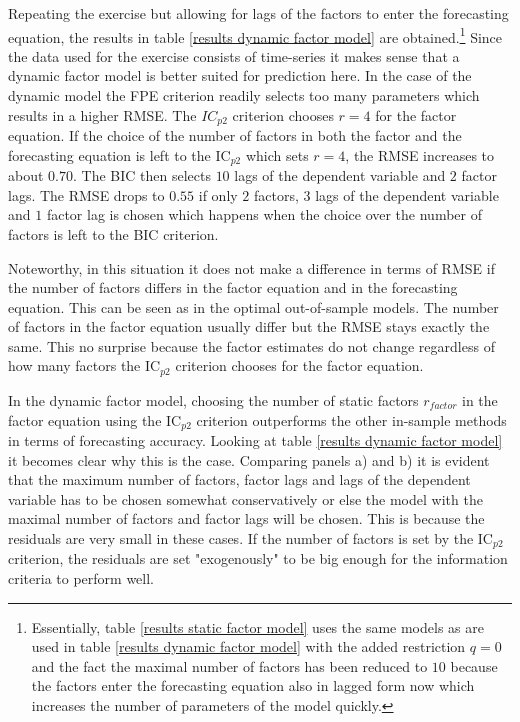 \documentclass[12pt]{article}
\begin{document}
Repeating the exercise but allowing for lags of the factors to enter the forecasting equation, the results in table \ref{results dynamic factor model} are obtained.\footnote{Essentially, table \ref{results static factor model} uses the same models as are used in table \ref{results dynamic factor model} with the added restriction $q=0$ and the fact the maximal number of factors has been reduced to $10$ because the factors enter the forecasting equation also in lagged form now which increases the number of parameters of the model quickly.} Since the data used for the exercise consists of time-series it makes sense that a dynamic factor model is better suited for prediction here. In the case of the dynamic model the FPE criterion readily selects too many parameters which results in a higher RMSE. The $IC_{p2}$ criterion chooses $r=4$ for the factor equation. If the choice of the number of factors in both the factor and the forecasting equation is left to the IC$_{p2}$ which sets $r=4$, the RMSE increases to about $0.70$. The BIC then selects $10$ lags of the dependent variable and $2$ factor lags. The RMSE drops to $0.55$ if only $2$ factors, $3$ lags of the dependent variable and $1$ factor lag is chosen which happens when the choice over the number of factors is left to the BIC criterion.

Noteworthy, in this situation it does not make a difference in terms of RMSE if the number of factors differs in the factor equation and in the forecasting equation. This can be seen as in the optimal out-of-sample models. The number of factors in the factor equation usually differ but the RMSE stays exactly the same. This no surprise because the factor estimates do not change regardless of how many factors the IC$_{p2}$ criterion chooses for the factor equation.

In the dynamic factor model, choosing the number of static factors $r_{factor}$ in the factor equation using the IC$_{p2}$ criterion outperforms the other in-sample methods in terms of forecasting accuracy. Looking at table \ref{results dynamic factor model} it becomes clear why this is the case. Comparing panels a) and b) it is evident that the maximum number of factors, factor lags and lags of the dependent variable has to be chosen somewhat conservatively or else the model with the maximal number of factors and factor lags will be chosen. This is because the residuals are very small in these cases. If the number of factors is set by the IC$_{p2}$ criterion, the residuals are set "exogenously" to be big enough for the information criteria to perform well.
\end{document}
